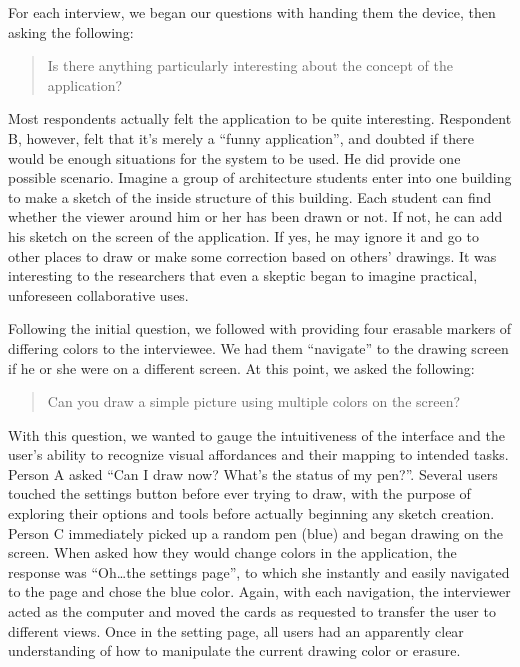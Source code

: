 \documentclass{chi2009}
\begin{document}
For each interview, we began our questions with handing them the device, then
asking the following:
\begin{quote}
Is there anything particularly interesting about the concept of the
application?
\end{quote}

Most respondents actually felt the application to be quite interesting.
Respondent B, however, felt that it's merely a ``funny application'', and doubted if 
there would be enough situations for the system to be used.   He did provide
one possible  scenario. Imagine a group of architecture students
enter into one building to make a sketch of the inside structure of this
building. Each student can find whether the viewer around him or her has been
drawn or not. If not, he can add his sketch on the screen of the application.
If yes, he may ignore it and go to other places to draw or make some correction
based on others' drawings.  It was interesting to the researchers that even a
skeptic began to imagine practical, unforeseen collaborative uses.

Following the initial question, we followed with providing four erasable
markers of differing colors to the interviewee.  We had them ``navigate'' to
the drawing screen if he or she were on a different screen.  At this point, we
asked the following:

\begin{quote}
Can you draw a simple picture using multiple colors on the screen?
\end{quote}

With this question, we wanted to gauge the intuitiveness of the interface and
the user's ability to recognize visual affordances and their mapping to
intended tasks.  Person A asked ``Can I draw now?  What's the status of my
pen?''.  Several users touched the settings button before ever trying to draw,
with the purpose of exploring their options and tools before actually beginning
any sketch creation.  Person C immediately picked up a random pen (blue) and
began drawing on the screen.  When asked how they would change colors in the
application, the response was ``Oh\ldots  the settings page'', to which she
instantly and easily navigated to the page and chose the blue color.  Again,
with each navigation, the interviewer acted as the computer and moved the cards
as requested to transfer the user to different views.  Once in the setting
page, all users had an apparently clear understanding of how to manipulate the
current drawing color or erasure.
\end{document}
